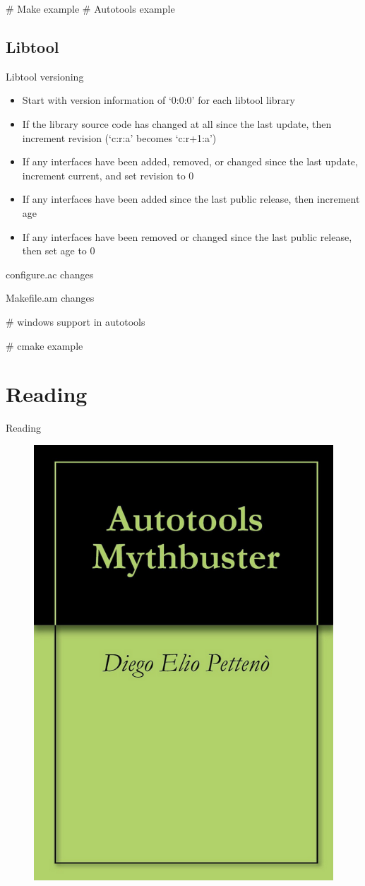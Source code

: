 \documentclass{beamer}
\begin{document}
# Make example
# Autotools example

\subsection{Libtool}

\begin{frame}{Libtool versioning}
	\begin{itemize}
	\item Start with version information of ‘0:0:0’ for each libtool library
	\item If the library source code has changed at all since the last update, then increment revision (‘c:r:a’ becomes ‘c:r+1:a’)
	\item If any interfaces have been added, removed, or changed since the last update, increment current, and set revision to 0
	\item If any interfaces have been added since the last public release, then increment age
	\item If any interfaces have been removed or changed since the last public release, then set age to 0
	\end{itemize}
\end{frame}

\begin{frame}[t]{configure.ac changes}
	\begin{small}
	
	\end{small}
\end{frame}

\begin{frame}[t]{Makefile.am changes}
	\begin{small}
	
	\end{small}
\end{frame}

# windows support in autotools

# cmake example

\section{Reading}

\begin{frame}{Reading}
	\begin{figure}
	\includegraphics[width= 0.4\linewidth]{mythbuster.png}
	\end{figure}
\end{frame}
\end{document}
